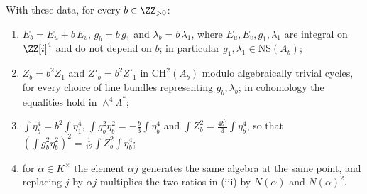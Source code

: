 \begin{proposition}
\label{prop:quatdivisible}
With these data, for every $b\in\ZZ_{>0}$:
\begin{enumerate}[label=\textup{(\roman*)},nosep]
\item $E_{b}=E_{u}+b\,E_{v}$, $g_{b}=b\,g_{1}$ and $\lambda_{b}=b\,\lambda_{1}$,
  where $E_{u},E_{v},g_{1},\lambda_{1}$ are integral on $\ZZ[i]^{4}$ and do not
  depend on $b$; in particular $g_{1},\lambda_{1}\in\mathrm{NS}(A_{b})$;
\item $Z_{b}=b^{2}Z_{1}$ and $Z'_{b}=b^{2}Z'_{1}$ in $\mathrm{CH}^{2}(A_{b})$
  modulo algebraically trivial cycles, for every choice of line bundles
  representing $g_{b},\lambda_{b}$; in cohomology the equalities hold in
  $\wedge^{4}\Lambda^{*}$;
\item $\int\eta_{b}^{4}=b^{2}\int\eta_{1}^{4}$,
  $\int g_{b}^{2}\eta_{b}^{2}=-\tfrac{b}{3}\int\eta_{b}^{4}$ and
  $\int Z_{b}^{2}=\tfrac{4b^{2}}{3}\int\eta_{b}^{4}$, so that
  $(\int g_{b}^{2}\eta_{b}^{2})^{2}=\tfrac{1}{12}\int Z_{b}^{2}\int\eta_{b}^{4}$;
\item for $\alpha\in K^{\times}$ the element $\alpha j$ generates the same
  algebra at the same point, and replacing $j$ by $\alpha j$ multiplies the
  two ratios in \textup{(iii)} by $N(\alpha)$ and $N(\alpha)^{2}$.
\end{enumerate}
\end{proposition}

